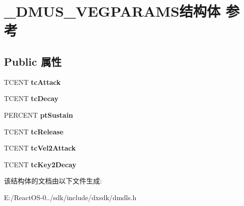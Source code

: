 \hypertarget{struct___d_m_u_s___v_e_g_p_a_r_a_m_s}{}\section{\+\_\+\+D\+M\+U\+S\+\_\+\+V\+E\+G\+P\+A\+R\+A\+M\+S结构体 参考}
\label{struct___d_m_u_s___v_e_g_p_a_r_a_m_s}
\subsection*{Public 属性}
\begin{DoxyCompactItemize}
\item 
\mbox{\label{struct___d_m_u_s___v_e_g_p_a_r_a_m_s_a6efac319c82b8973f0ebc5aa7580096b}} 
T\+C\+E\+NT {\bfseries tc\+Attack}
\item 
\mbox{\label{struct___d_m_u_s___v_e_g_p_a_r_a_m_s_a2ad0488d728e669026c473fa1be702ac}} 
T\+C\+E\+NT {\bfseries tc\+Decay}
\item 
\mbox{\label{struct___d_m_u_s___v_e_g_p_a_r_a_m_s_a934054201a91eb063688cc8c17985cb4}} 
P\+E\+R\+C\+E\+NT {\bfseries pt\+Sustain}
\item 
\mbox{\label{struct___d_m_u_s___v_e_g_p_a_r_a_m_s_a91fdf9a370529a5a005f14d256134cbd}} 
T\+C\+E\+NT {\bfseries tc\+Release}
\item 
\mbox{\label{struct___d_m_u_s___v_e_g_p_a_r_a_m_s_a51e6c1e489d2300f6ab545a886ee3eb9}} 
T\+C\+E\+NT {\bfseries tc\+Vel2\+Attack}
\item 
\mbox{\label{struct___d_m_u_s___v_e_g_p_a_r_a_m_s_a4d592db561c8447fca3c90816d32af75}} 
T\+C\+E\+NT {\bfseries tc\+Key2\+Decay}
\end{DoxyCompactItemize}


该结构体的文档由以下文件生成\+:\begin{DoxyCompactItemize}
\item 
E\+:/\+React\+O\+S-\/0../sdk/include/dxsdk/dmdls.\+h\end{DoxyCompactItemize}
